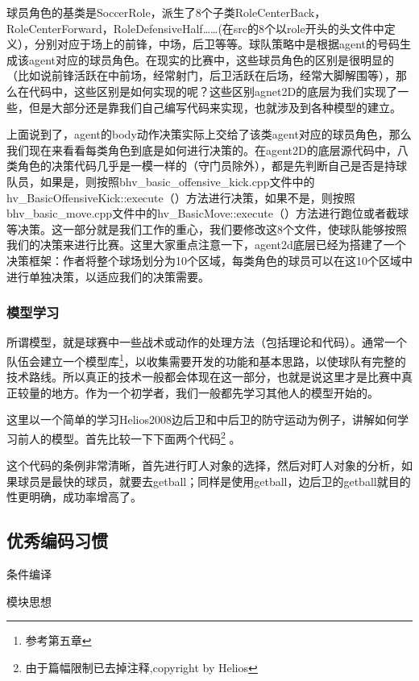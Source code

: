 球员角色的基类是SoccerRole，派生了8个子类RoleCenterBack，RoleCenterForward，RoleDefensiveHalf……(在src的8个以role开头的头文件中定义），分别对应于场上的前锋，中场，后卫等等。球队策略中是根据agent的号码生成该agent对应的球员角色。在现实的比赛中，这些球员角色的区别是很明显的（比如说前锋活跃在中前场，经常射门，后卫活跃在后场，经常大脚解围等），那么在代码中，这些区别是如何实现的呢？这些区别agnet2D的底层为我们实现了一些，但是大部分还是靠我们自己编写代码来实现，也就涉及到各种模型的建立。

上面说到了，agent的body动作决策实际上交给了该类agent对应的球员角色，那么我们现在来看看每类角色到底是如何进行决策的。在agent2D的底层源代码中，八类角色的决策代码几乎是一模一样的（守门员除外），都是先判断自己是否是持球队员，如果是，则按照bhv_basic_offensive_kick.cpp文件中的hv_BasicOffensiveKick::execute（）方法进行决策，如果不是，则按照bhv_basic_move.cpp文件中的hv_BasicMove::execute（）方法进行跑位或者截球等决策。这一部分就是我们工作的重心，我们要修改这8个文件，使球队能够按照我们的决策来进行比赛。这里大家重点注意一下，agent2d底层已经为搭建了一个决策框架：作者将整个球场划分为10个区域，每类角色的球员可以在这10个区域中进行单独决策，以适应我们的决策需要。
\subsubsection{模型学习}
所谓模型，就是球赛中一些战术或动作的处理方法（包括理论和代码）。通常一个队伍会建立一个模型库\footnote{参考第五章}，以收集需要开发的功能和基本思路，以使球队有完整的技术路线。所以真正的技术一般都会体现在这一部分，也就是说这里才是比赛中真正较量的地方。作为一个初学者，我们一般都先学习其他人的模型开始的。

这里以一个简单的学习Helios2008边后卫和中后卫的防守运动为例子，讲解如何学习前人的模型。首先比较一下下面两个代码\footnote{由于篇幅限制已去掉注释,copyright by Helios} 。

\begin{Codex}[label=bhv_side_back_defensive_move.cpp]


\end{Codex}
这个代码的条例非常清晰，首先进行盯人对象的选择，然后对盯人对象的分析，如果球员是最快的球员，就要去getball；同样是使用getball，边后卫的getball就目的性更明确，成功率增高了。
\subsection{优秀编码习惯}

条件编译

模块思想

